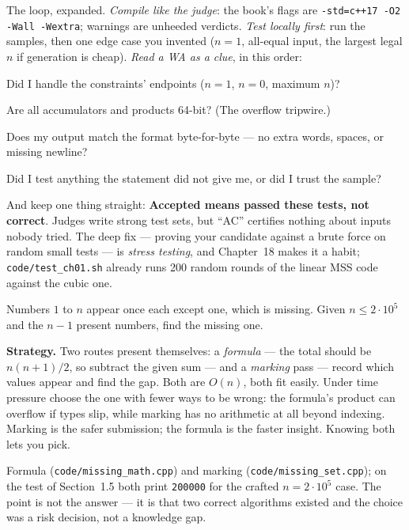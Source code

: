 The loop, expanded. \emph{Compile like the judge}: the book's flags are
\texttt{-std=c++17 -O2 -Wall -Wextra}; warnings are unheeded verdicts.
\emph{Test locally first}: run the samples, then one edge case you invented
($n=1$, all-equal input, the largest legal $n$ if generation is cheap).
\emph{Read a WA as a clue}, in this order:

\begin{checklist}
\item Did I handle the constraints' endpoints ($n=1$, $n=0$, maximum $n$)?
\item Are all accumulators and products 64-bit? (The overflow tripwire.)
\item Does my output match the format byte-for-byte --- no extra words,
spaces, or missing newline?
\item Did I test anything the statement did not give me, or did I trust
the sample?
\end{checklist}

And keep one thing straight: \textbf{Accepted means passed these tests, not
correct}. Judges write strong test sets, but ``AC'' certifies nothing about
inputs nobody tried. The deep fix --- proving your candidate against a brute
force on random small tests --- is \emph{stress testing},
and Chapter~18 makes it a habit; \texttt{code/test\_ch01.sh} already runs
200 random rounds of the linear MSS code against the cubic one.

\begin{example}
\label{ex:missing}
Numbers $1$ to $n$ appear once each except one, which is missing. Given
$n \le 2\cdot10^5$ and the $n-1$ present numbers, find the missing one.
\par\smallskip
\textbf{Strategy.} Two routes present themselves: a \emph{formula} ---
the total should be $n(n+1)/2$, so subtract the given sum --- and a
\emph{marking} pass --- record which values appear and find the gap. Both
are $O(n)$, both fit easily. Under time pressure choose the one with fewer
ways to be wrong: the formula's product can overflow if types slip, while
marking has no arithmetic at all beyond indexing. Marking is the safer
submission; the formula is the faster insight. Knowing both lets you pick.
\par\smallskip
\begin{solution}
Formula (\texttt{code/missing\_math.cpp}) and marking
(\texttt{code/missing\_set.cpp}); on the test of Section~1.5 both print
\texttt{200000} for the crafted $n=2\cdot10^5$ case. The point is not the
answer --- it is that two correct algorithms existed and the choice was a
risk decision, not a knowledge gap.
\end{solution}
\end{example}

